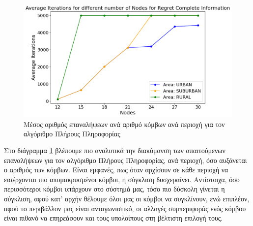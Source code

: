 \begin{figure}[ht]
    \centering
    \includegraphics[width=\textwidth]{figures/chapter4/RCI_Iterations_vs_Users_per_Area.png}
    \caption{Μέσος αριθμός επαναλήψεων ανά αριθμό κόμβων ανά περιοχή για τον αλγόριθμο Πλήρους Πληροφορίας}
    \label{fig45}
\end{figure}

Στο διάγραμμα \ref{fig45} βλέπουμε πιο αναλυτικά την διακύμανση των απαιτούμενων επαναλήψεων για τον αλγόριθμο Πλήρους Πληροφορίας, ανά περιοχή, όσο αυξάνεται ο αριθμός των κόμβων. Είναι εμφανές, πως όταν αρχίσουν σε κάθε περιοχή να εισέρχονται πιο απομακρυσμένοι κόμβοι, η σύγκλιση δυσχεραίνει. Αντίστοιχα, όσο περισσότεροι κόμβοι υπάρχουν στο σύστημά μας, τόσο πιο δύσκολη γίνεται η σύγκλιση, αφού κατ' αρχήν θέλουμε όλοι μας οι κόμβοι να συγκλίνουν, ενώ επιπλέον, αφού το περιβάλλον μας είναι ανταγωνιστικό, οι αλλαγές συμπεριφοράς ενός κόμβου είναι πιθανό να επηρεάσουν και τους υπολοίπους στη βέλτιστη επιλογή τους.